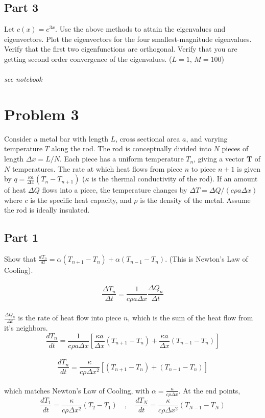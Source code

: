 \documentclass{amsart}
\begin{document}
	\subsection{Part 3}
	Let $c(x) = e^{3x}$. Use the above methods to attain the eigenvalues and eigenvectors. Plot the eigenvectors for the four smallest-magnitude eigenvalues. Verify that the first two eigenfunctions are orthogonal. Verify that you are getting second order convergence of the eigenvalues. ($L=1$, $M=100$)
	\\\\
	\textit{see notebook}
	\pagebreak
	\section{Problem 3}
	Consider a metal bar with length $L$, cross sectional area $a$, and varying temperature $T$ along the rod. The rod is conceptually divided into $N$ pieces of length $\Delta x = L/N$. Each piece has a uniform temperature $T_n$, giving a vector $\mathbf{T}$ of $N$ temperatures. The rate at which heat flows from piece $n$ to piece $n+1$ is given by $q = \frac{\kappa a}{\Delta x}(T_n - T_{n+1})$ ($\kappa$ is the thermal conductivity of the rod). If an amount of heat $\Delta Q$ flows into a piece, the temperature changes by $\Delta T = \Delta Q / (c\rho a\Delta x)$ where $c$ is the specific heat capacity, and $\rho$ is the density of the metal. Assume the rod is ideally insulated.
	\\
	\subsection{Part 1}
	Show that $\frac{dT_n}{dt} = \alpha(T_{n+1}-T_n) + \alpha(T_{n-1}-T_n)$. (This is Newton's Law of Cooling).
	\\\\
	\[ \frac{\Delta T_n}{\Delta t} = \frac{1}{c\rho a\Delta x}\frac{\Delta Q_n}{\Delta t}
	\]\\
	$\frac{\Delta Q_n}{\Delta t}$ is the rate of heat flow into piece $n$, which is the sum of the heat flow from it's neighbors.\\
	\[ \frac{dT_n}{dt} = \frac{1}{c\rho a\Delta x}\left[
	\frac{\kappa a}{\Delta x}(T_{n+1}-T_n) + 	\frac{\kappa a}{\Delta x}(T_{n-1}-T_n) \right]
	\]\\
	\[ \frac{dT_n}{dt} = \frac{\kappa}{c\rho \Delta x^2}\left[ (T_{n+1}-T_n)+(T_{n-1}-T_n) \right]
	\]\\
	which matches Newton's Law of Cooling, with $\alpha = \frac{\kappa}{c\rho\Delta x}$. At the end points,\\
	\[ \frac{dT_1}{dt} = \frac{\kappa}{c\rho\Delta x^2}(T_2 - T_1) \quad , \quad \frac{dT_N}{dt} = \frac{\kappa}{c\rho\Delta x^2}(T_{N-1} - T_N)
	\]
	\\
\end{document}
